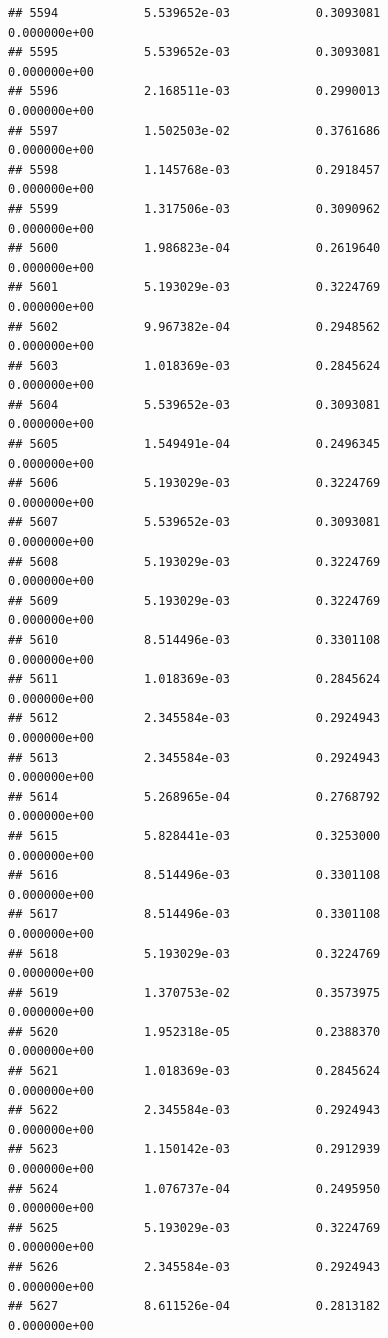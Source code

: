 \documentclass[
]{article}
\begin{document}
\begin{verbatim}
## 5594            5.539652e-03            0.3093081            0.000000e+00
## 5595            5.539652e-03            0.3093081            0.000000e+00
## 5596            2.168511e-03            0.2990013            0.000000e+00
## 5597            1.502503e-02            0.3761686            0.000000e+00
## 5598            1.145768e-03            0.2918457            0.000000e+00
## 5599            1.317506e-03            0.3090962            0.000000e+00
## 5600            1.986823e-04            0.2619640            0.000000e+00
## 5601            5.193029e-03            0.3224769            0.000000e+00
## 5602            9.967382e-04            0.2948562            0.000000e+00
## 5603            1.018369e-03            0.2845624            0.000000e+00
## 5604            5.539652e-03            0.3093081            0.000000e+00
## 5605            1.549491e-04            0.2496345            0.000000e+00
## 5606            5.193029e-03            0.3224769            0.000000e+00
## 5607            5.539652e-03            0.3093081            0.000000e+00
## 5608            5.193029e-03            0.3224769            0.000000e+00
## 5609            5.193029e-03            0.3224769            0.000000e+00
## 5610            8.514496e-03            0.3301108            0.000000e+00
## 5611            1.018369e-03            0.2845624            0.000000e+00
## 5612            2.345584e-03            0.2924943            0.000000e+00
## 5613            2.345584e-03            0.2924943            0.000000e+00
## 5614            5.268965e-04            0.2768792            0.000000e+00
## 5615            5.828441e-03            0.3253000            0.000000e+00
## 5616            8.514496e-03            0.3301108            0.000000e+00
## 5617            8.514496e-03            0.3301108            0.000000e+00
## 5618            5.193029e-03            0.3224769            0.000000e+00
## 5619            1.370753e-02            0.3573975            0.000000e+00
## 5620            1.952318e-05            0.2388370            0.000000e+00
## 5621            1.018369e-03            0.2845624            0.000000e+00
## 5622            2.345584e-03            0.2924943            0.000000e+00
## 5623            1.150142e-03            0.2912939            0.000000e+00
## 5624            1.076737e-04            0.2495950            0.000000e+00
## 5625            5.193029e-03            0.3224769            0.000000e+00
## 5626            2.345584e-03            0.2924943            0.000000e+00
## 5627            8.611526e-04            0.2813182            0.000000e+00

\end{verbatim}
\end{document}
